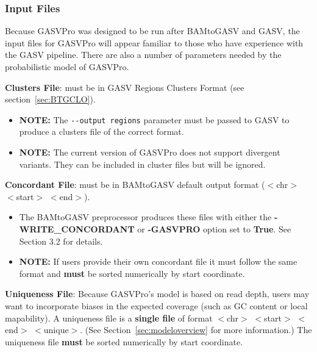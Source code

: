 \documentclass[11pt]{article}
\begin{document}
\subsubsection{Input Files}
Because GASVPro was designed to be run after BAMtoGASV and GASV, the input files for GASVPro will appear familiar to those who have experience with the GASV pipeline. There are also a number of parameters needed by the probabilistic model of GASVPro.

\begin{description}
\item{\bf Clusters File}: must be in GASV Regions Clusters Format (see section~\ref{sec:BTGCLO}). 
\begin{itemize}
\item {\bf NOTE:} The \verb+--output regions+ parameter must be passed to GASV to produce a clusters file of the correct format. 
\item {\bf NOTE:} The current version of GASVPro does not support divergent variants. They can be included in cluster files but will be ignored. 
\end{itemize}
\item{\bf Concordant File}: must be in BAMtoGASV default output format ($<$chr$>$ $<$start$>$ $<$end$>$). 
\begin{itemize}
\item The BAMtoGASV preprocessor produces these files with either the {\bf-WRITE\_CONCORDANT} or {\bf-GASVPRO} option set to {\bf True}. See Section 3.2 for details. 
\item {\bf NOTE:} If users provide their own concordant file it must follow the same format and {\bf must} be sorted numerically by start coordinate.
\end{itemize}
\item{\bf Uniqueness File}:  Because GASVPro's model is based on read depth, users may want to incorporate biases in the expected coverage (such as GC content or local mapability). A uniqueness file is a {\bf single file} of format $<$chr$>$ $<$start$>$ $<$end$>$ $<$unique$>$. (See Section~\ref{sec:modeloverview} for more information.) The uniqueness file {\bf must} be sorted numerically by start coordinate.
\end{description}
\end{document}
